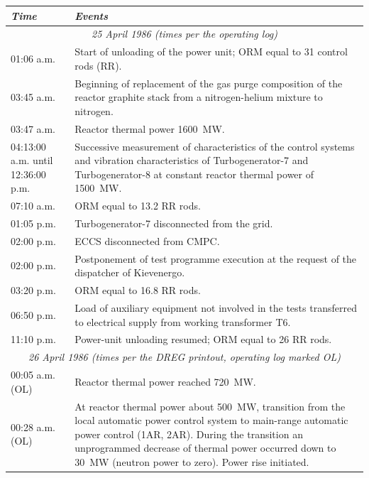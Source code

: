 \documentclass[openright]{bookest}
\begin{document}
\small\begin{center}
  \begin{longtable}{|p{6em}|p{27em}|}
    \hline
    \textit{Time} & \textit{Events} \\
    \hline
    \multicolumn{2}{|c|}{\textit{25 April 1986 (times per the operating log)}} \\
    \hline
    01:06 a.m. & Start of unloading of the power unit; ORM equal to \num{31} control rods (RR). \\ \hline
    03:45 a.m. & Beginning of replacement of the gas purge composition of the reactor graphite stack from a nitrogen-helium mixture to nitrogen. \\ \hline
    03:47 a.m. & Reactor thermal power \qty{1600}{\mega\watt}. \\ \hline
    04:13:00 a.m. until 12:36:00 p.m. & Successive measurement of characteristics of the control systems and vibration characteristics of Turbogenerator-7 and Turbogenerator-8 at constant reactor thermal power of \qty{1500}{\mega\watt}. \\ \hline
    07:10 a.m. & ORM equal to \num{13.2} RR rods. \\ \hline
    01:05 p.m. & Turbogenerator-7 disconnected from the grid. \\ \hline
    02:00 p.m. & ECCS disconnected from CMPC. \\ \hline
    02:00 p.m. & Postponement of test programme execution at the request of the dispatcher of Kievenergo. \\ \hline
    03:20 p.m. & ORM equal to \num{16.8} RR rods. \\ \hline
    06:50 p.m. & Load of auxiliary equipment not involved in the tests transferred to electrical supply from working transformer T6. \\ \hline
    11:10 p.m. & Power-unit unloading resumed; ORM equal to \num{26} RR rods. \\ \hline
    \multicolumn{2}{|c|}{\textit{26 April 1986 (times per the DREG printout, operating log marked OL)}} \\ \hline
    00:05 a.m. (OL) & Reactor thermal power reached \qty{720}{\mega\watt}. \\ \hline
    00:28 a.m. (OL) & At reactor thermal power about \qty{500}{\mega\watt}, transition from the local automatic power control system to main-range automatic power control (1AR, 2AR). During the transition an unprogrammed decrease of thermal power occurred down to \qty{30}{\mega\watt} (neutron power to zero). Power rise initiated. \\ \hline

\end{longtable}
\end{center}
\end{document}
